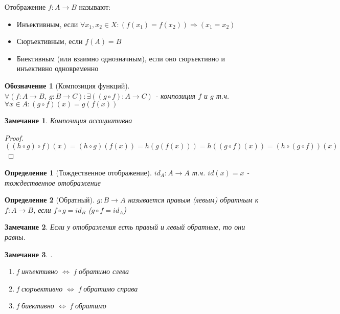\documentclass[12pt, a4]{article}
\newtheorem*{definition}{Определение}
\newtheorem*{notation}{Обозначение}
\newtheorem*{remark}{Замечание}
\renewcommand{\implies}{\Rightarrow}
\renewcommand{\iff}{\Leftrightarrow}
\begin{document}
Отображение $f: A \to B$ называют:
\begin{itemize}
    \item Инъективным, если $\forall x_1, x_2 \in X: (f(x_1) = f(x_2)) \implies (x_1 = x_2)$
    \item Сюръективным, если $f(A) = B$
    \item Биективным (или взаимно однозначным), если оно сюръективно и инъективно одновременно
\end{itemize}

\begin{notation}[Композиция функций]
 $\forall (f:A \to B, \  g: B \to C): \exists ((g \circ f) : A \to C )$ - композиция $f$ и $g$ т.ч. $\forall x \in A: (g \circ f)(x) = g(f(x))$
\end{notation}

\begin{remark}
Композиция ассоциативна
\end{remark}

\begin{proof}
$((h \circ g) \circ f)(x) = (h \circ g)(f(x)) = h(g(f(x))) = h((g \circ f)(x)) = (h \circ (g \circ f))(x)$
\end{proof}

\begin{definition}[Тождественное отображение]
$id_A: A \to A$ т.ч. $id(x)=x$ - тождественное отображение    
\end{definition}

\begin{definition}[Обратный]
$g: B \to A$ называется правым (левым) обратным к $f: A \to B$, если $f \circ g = id_B$ ($g \circ f = id_A$)
\end{definition}

\begin{remark}
Если у отображения есть правый и левый обратные, то они равны.
\end{remark}

\begin{remark}.
\begin{enumerate}
    \item f инъективно $\iff$ f обратимо слева
    \item f сюръективно $\iff$ f обратимо справа
    \item f биективно $\iff$ f обратимо
\end{enumerate}
\end{remark}
\end{document}
